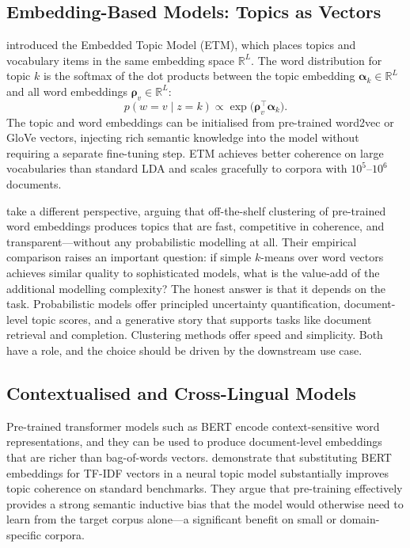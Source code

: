 \documentclass[11pt,a4paper]{article}
\newcommand{\vect}[1]{\boldsymbol{#1}}
\newcommand{\R}{\mathbb{R}}
\begin{document}
\subsection{Embedding-Based Models: Topics as Vectors}
\label{sec:etm}

\textcite{dieng2020topic} introduced the Embedded Topic Model (ETM),
which places topics and vocabulary items in the same embedding space
$\R^{L}$.
The word distribution for topic $k$ is the softmax of the dot products
between the topic embedding $\vect{\alpha}_{k} \in \R^{L}$ and all word
embeddings $\vect{\rho}_{v} \in \R^{L}$:
\[
  p(w = v \mid z = k) \propto \exp\bigl(\vect{\rho}_{v}^{\top}
  \vect{\alpha}_{k}\bigr).
\]
The topic and word embeddings can be initialised from pre-trained
word2vec or GloVe vectors, injecting rich semantic knowledge into the
model without requiring a separate fine-tuning step.
ETM achieves better coherence on large vocabularies than standard LDA
and scales gracefully to corpora with $10^{5}$--$10^{6}$ documents.

\textcite{sia2020tired} take a different perspective, arguing that
off-the-shelf clustering of pre-trained word embeddings produces topics
that are fast, competitive in coherence, and transparent---without any
probabilistic modelling at all.
Their empirical comparison raises an important question: if simple
$k$-means over word vectors achieves similar quality to sophisticated
models, what is the value-add of the additional modelling complexity?
The honest answer is that it depends on the task.
Probabilistic models offer principled uncertainty quantification,
document-level topic scores, and a generative story that supports
tasks like document retrieval and completion.
Clustering methods offer speed and simplicity.
Both have a role, and the choice should be driven by the downstream
use case.

\subsection{Contextualised and Cross-Lingual Models}
\label{sec:contextualized}

Pre-trained transformer models such as BERT encode context-sensitive
word representations, and they can be used to produce document-level
embeddings that are richer than bag-of-words vectors.
\textcite{bianchi2021pretraining} demonstrate that substituting BERT
embeddings for TF-IDF vectors in a neural topic model substantially
improves topic coherence on standard benchmarks.
They argue that pre-training effectively provides a strong semantic
inductive bias that the model would otherwise need to learn from the
target corpus alone---a significant benefit on small or domain-specific
corpora.
\end{document}
